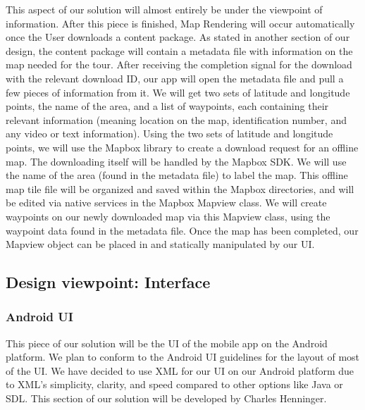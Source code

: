 \documentclass[letterpaper, 10pt,titlepage]{article}
\begin{document}
This aspect of our solution will almost entirely be under the viewpoint of information. After this piece is finished, Map Rendering will occur automatically once the User downloads a content package. As stated in another section of our design, the content package will contain a metadata file with information on the map needed for the tour. After receiving the completion signal for the download with the relevant download ID, our app will open the metadata file and pull a few pieces of information from it. We will get two sets of latitude and longitude points, the name of the area, and a list of waypoints, each containing their relevant information (meaning location on the map, identification number, and any video or text information). Using the two sets of latitude and longitude points, we will use the Mapbox library to create a download request for an offline map. The downloading itself will be handled by the Mapbox SDK. We will use the name of the area (found in the metadata file) to label the map. This offline map tile file will be organized and saved within the Mapbox directories, and will be edited via native services in the Mapbox Mapview class. We will create waypoints on our newly downloaded map via this Mapview class, using the waypoint data found in the metadata file. Once the map has been completed, our Mapview object can be placed in and statically manipulated by our UI.




\subsection{Design viewpoint: Interface}

\subsubsection{Android UI}
This piece of our solution will be the UI of the mobile app on the Android platform. We plan to conform to the Android UI guidelines for the layout of most of the UI. We have decided to use XML for our UI on our Android platform due to XML’s  simplicity, clarity, and speed compared to other options like Java or SDL. This section of our solution will be developed by Charles Henninger.
\end{document}
